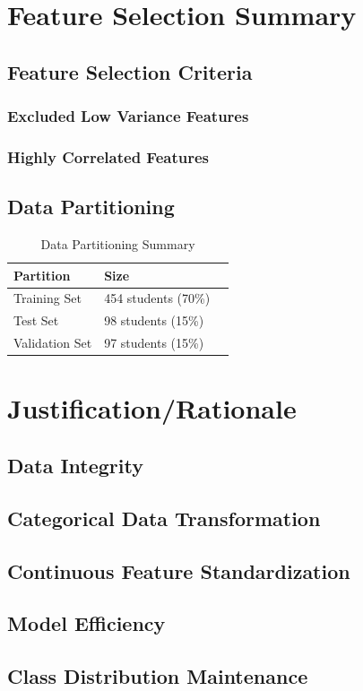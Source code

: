 \documentclass[twocolumn]{svjour3}
\begin{document}
\section{Feature Selection Summary}
\subsection{Feature Selection Criteria}
\subsubsection{Excluded Low Variance Features}
\subsubsection{Highly Correlated Features}
\subsection{Data Partitioning}
\begin{table}
\centering
\caption{Data Partitioning Summary}
\begin{tabular}{lll}
\hline
Partition & Size \\
\hline
Training Set & 454 students (70\%) \\
Test Set & 98 students (15\%) \\
Validation Set & 97 students (15\%) \\
\hline
\end{tabular}
\end{table}
\section{Justification/Rationale}
\subsection{Data Integrity}
\subsection{Categorical Data Transformation}
\subsection{Continuous Feature Standardization}
\subsection{Model Efficiency}
\subsection{Class Distribution Maintenance}
\end{document}
